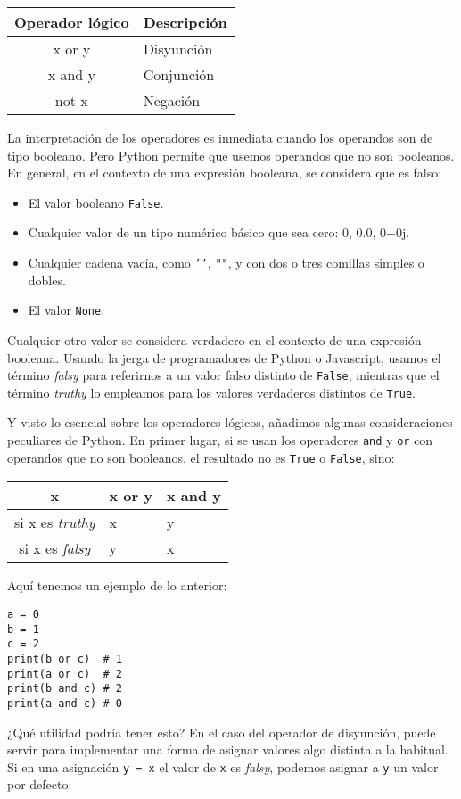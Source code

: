 \begin{tabular}{c|l}
	Operador lógico & Descripción\\
	\hline\hline
	x or y & Disyunción\\
	\hline
	x and y & Conjunción\\
	\hline
	not x & Negación
\end{tabular}

La interpretación de los operadores es inmediata cuando los operandos son de tipo booleano. Pero Python permite que usemos operandos que no son booleanos. En general, en el contexto de una expresión booleana, se considera que es falso:
\begin{itemize}
	\item El valor booleano \texttt{False}.
	\item Cualquier valor de un tipo numérico básico que sea cero: 0, 0.0, 0+0j.
	\item Cualquier cadena vacía, como \texttt{'{}'{}}, \texttt{"{}"{}}, y con dos o tres comillas simples o dobles.
	\item El valor \texttt{None}.
\end{itemize}

Cualquier otro valor se considera verdadero en el contexto de una expresión booleana. Usando la jerga de programadores de Python o Javascript, usamos el término \emph{falsy} para referirnos a un valor falso distinto de \texttt{False}, mientras que el término \emph{truthy} lo empleamos para los valores verdaderos distintos de \texttt{True}.

Y visto lo esencial sobre los operadores lógicos, añadimos algunas consideraciones peculiares de Python. En primer lugar, si se usan los operadores \texttt{and} y \texttt{or} con operandos que no son booleanos, el resultado no es \texttt{True} o \texttt{False}, sino:

\begin{tabular}{c||l|l}
	x & x or y & x and y\\
	\hline\hline
	si x es \emph{truthy}  & x & y\\
	\hline
	si x es \emph{falsy} & y & x
\end{tabular}

Aquí tenemos un ejemplo de lo anterior:

\begin{lstlisting}
a = 0
b = 1
c = 2
print(b or c)  # 1
print(a or c)  # 2
print(b and c) # 2
print(a and c) # 0
\end{lstlisting}

¿Qué utilidad podría tener esto? En el caso del operador de disyunción, puede servir para implementar una forma de asignar valores algo distinta a la habitual. Si en una asignación \texttt{y = x} el valor de \texttt{x} es \emph{falsy}, podemos asignar a \texttt{y} un valor por defecto:

